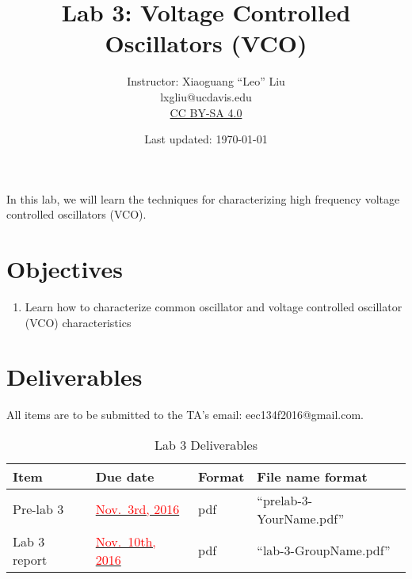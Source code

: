 \documentclass[letterpaper, 11pt]{article}
\newcommand{\due}[1]{\href{https://github.com/ucdart/UCD-EEC134/blob/master/support/schedule/eec134-schedule.pdf}{\textcolor{red}{#1}}}
\begin{document}
\title{Lab 3: Voltage Controlled Oscillators (VCO)}
\author{Instructor: Xiaoguang ``Leo'' Liu\\lxgliu@ucdavis.edu \\
	\small \href{http://creativecommons.org/licenses/by-sa/4.0/}{CC BY-SA 4.0}}
\date{Last updated: \today}

\maketitle

In this lab, we will learn the techniques for characterizing high frequency voltage controlled oscillators (VCO). 

\section{Objectives}

\begin{enumerate}[itemsep=0.1ex]
	\item Learn how to characterize common oscillator and voltage controlled oscillator (VCO) characteristics	
\end{enumerate}



\section{Deliverables}
All items are to be submitted to the TA's email: eec134f2016@gmail.com.  

\vspace{0.5cm}

\begin{table}[h]
	\footnotesize
	\caption{Lab 3 Deliverables}
	\renewcommand{\arraystretch}{1.2}
	\begin{tabular}{|m{1in}|l|m{0.45in}|m{2in}|}
		\hline
		\textbf{Item} & \textbf{Due date} & \textbf{Format} & \textbf{File name format} \\
		\hline \hline
		Pre-lab 3 & \due{Nov.~3rd, 2016} & pdf & ``prelab-3-YourName.pdf'' \\
		\hline
		Lab 3 report & \due{Nov.~10th, 2016} & pdf & ``lab-3-GroupName.pdf''\\
		\hline
	\end{tabular}
\end{table}
\end{document}
